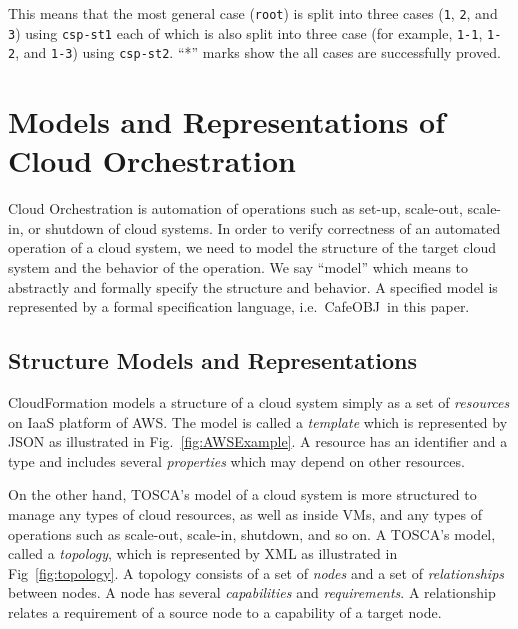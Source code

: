 \documentclass[12pt]{report}
\newcommand{\cafeobj}{{\sf CafeOBJ}~}
\begin{document}
\normalsize
This means that the most general case ({\tt root}) is split into three
cases ({\tt 1}, {\tt 2}, and {\tt 3}) using {\tt csp-st1} each of
which is also split into three case (for example, {\tt 1-1},
{\tt 1-2}, and {\tt 1-3}) using {\tt csp-st2}.  ``*'' marks show the
all cases are successfully proved.

\chapter{Models and Representations of Cloud Orchestration}
\label{chap:model}
Cloud Orchestration is automation of operations such as set-up,
scale-out, scale-in, or shutdown of cloud systems. In order to verify
correctness of an automated operation of a cloud system, we need to
model the structure of the target cloud system and the behavior of the
operation. We say ``model'' which means to abstractly and formally
specify the structure and behavior. A specified model is represented
by a formal specification language, i.e.\ \cafeobj in this paper.

\section{Structure Models and Representations}
\label{sec:structuremodel}
CloudFormation models a structure of a cloud system simply as a set
of {\it resources} on IaaS platform of AWS. The model is called a {\it
  template} which is represented by JSON as illustrated in
Fig.~\ref{fig:AWSExample}.  A resource has an identifier and a type
and includes several {\it properties} which may depend on other
resources.

On the other hand, TOSCA's model of a cloud system is more structured
to manage any types of cloud resources, as well as inside VMs, and any
types of operations such as scale-out, scale-in, shutdown, and so on.
A TOSCA's model, called a {\it topology}, which is represented by XML
as illustrated in Fig~\ref{fig:topology}. A topology consists of a set
of {\it nodes} and a set of {\it relationships} between nodes. A node
has several {\it capabilities} and {\it requirements}. A relationship
relates a requirement of a source node to a capability of a target
node.
\end{document}
